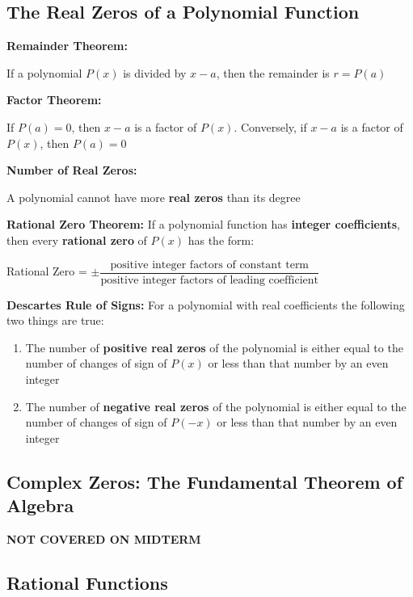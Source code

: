 \documentclass[12pt]{article}
\begin{document}
\subsection{The Real Zeros of a Polynomial Function}

\textbf{Remainder Theorem:} 
\newline

\centerline{If a polynomial $P(x)$ is divided by $x-a$, then the remainder is $r = P(a)$}

\textbf{Factor Theorem:} 
\newline

\centerline{If $P(a) = 0$, then $x - a$ is a factor of $P(x)$. Conversely, if $x-a$ is a factor of $P(x)$, then $P(a) = 0$ }

\textbf{Number of Real Zeros:} 
\newline

\centerline{A polynomial cannot have more \textbf{real zeros} than its degree}

\textbf{Rational Zero Theorem:} If a polynomial function has \textbf{integer coefficients}, then every \textbf{rational zero} of $P(x)$ has the form:
\newline

\centerline{Rational Zero = $\pm \dfrac{\text{positive integer factors of constant term}}{\text{positive integer factors of leading coefficient}}$}

\textbf{Descartes Rule of Signs:} For a polynomial with real coefficients the following two things are true:
\newline

\begin{enumerate}
\item The number of \textbf{positive real zeros} of the polynomial is either equal to the number of changes of sign of $P(x)$ or less than that number by an even integer
\item The number of \textbf{negative real zeros} of the polynomial is either equal to the number of changes of sign of $P(-x)$ or less than that number by an even integer
\end{enumerate}

\subsection{Complex Zeros: The Fundamental Theorem of Algebra}

\centerline{\textbf{NOT COVERED ON MIDTERM}}

\subsection{Rational Functions}
\end{document}
